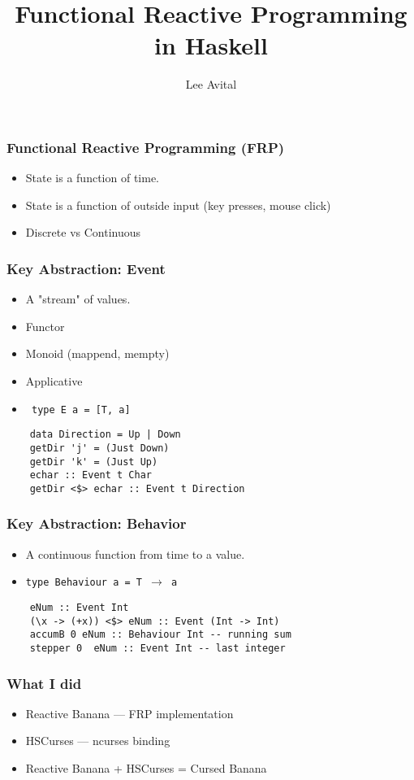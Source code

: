 \documentclass{beamer}
\title{Functional Reactive Programming in Haskell}
\author{Lee Avital}
\begin{document}
\maketitle

\begin{frame}
  \frametitle{Functional Reactive Programming (FRP)}

  \begin{itemize}
    \item State is a function of time.
    \item State is a function of outside input (key presses, mouse click)
    \item Discrete vs Continuous
  \end{itemize}
\end{frame}

\begin{frame}[fragile]
  \frametitle{Key Abstraction: Event}


  \begin{itemize}
    \item A "stream" of values.
    \item Functor
    \item Monoid (mappend, mempty)
    \item Applicative
    \item \texttt{ type E a = [T, a] }
  \end{itemize}

  \begin{Verbatim}
    data Direction = Up | Down
    getDir 'j' = (Just Down)
    getDir 'k' = (Just Up)
    echar :: Event t Char
    getDir <$> echar :: Event t Direction
  \end{Verbatim}

\end{frame}




\begin{frame}[fragile]
  \frametitle{Key Abstraction: Behavior}

  \begin{itemize}
    \item A continuous function from time to a value.
    \item \texttt{type Behaviour a = T $\rightarrow$  a}
  \end{itemize}
  \begin{Verbatim}
    eNum :: Event Int
    (\x -> (+x)) <$> eNum :: Event (Int -> Int)
    accumB 0 eNum :: Behaviour Int -- running sum
    stepper 0  eNum :: Event Int -- last integer
  \end{Verbatim}
\end{frame}


\begin{frame}[fragile]
  \frametitle{What I did}

  \begin{itemize}
    \item Reactive Banana --- FRP implementation
    \item HSCurses --- ncurses binding
    \item Reactive Banana + HSCurses = Cursed Banana
  \end{itemize}

\end{frame}
\end{document}
